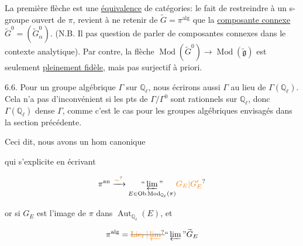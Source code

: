 La première flèche est une \uline{équivalence}  de catégories: le fait de restreindre   à un s-groupe ouvert de $\pi$, revient à  ne retenir de $\widetilde G=\pi^{\mathrm{alg}}$ que la \uline{composante connexe} $\widetilde G^0=(\widetilde G_\alpha^0)$. (N.B. Il  pas question de parler de composantes connexes dans le contexte analytique). Par contre, la flèche $\operatorname{Mod}(\widetilde G^0)\longrightarrow\operatorname{Mod}(\widetilde{\mathfrak g})$ est seulement \uline{pleinement fidèle}, mais pas    surjectif à priori.

6.6.  Pour un groupe algébrique  $\Gamma$ sur $\mathbb Q_\ell$, nous écrirons aussi $\Gamma$ au lieu de $\Gamma(\mathbb Q_\ell)$. Cela n'a pas d'inconvénient si les pts de $\Gamma/\Gamma^0$ sont rationnels sur $\mathbb Q_\ell$, donc $\Gamma(\mathbb Q_\ell)$ dense  $\Gamma$, comme c'est  le cas pour les groupes algébriques envisagés dans la section précédente.

Ceci dit, nous avons un hom canonique


qui s'explicite en écrivant

\[
\pi^{\mathrm{an}}\xrightarrow{\unsure{\sim}}\underset{E\in\operatorname{Ob}\operatorname{Mod}_{\mathbb Q_\ell}(\pi)}{\text{``}\varprojlim\text{''}}\unsure{G_E|G'_E}
\]

or si $G_E$ est l'image de $\pi$ dans $\operatorname{Aut}_{\mathbb Q_\ell}(E)$, et

\[
\pi^{\mathrm{alg}}=\deleted{\unsure{\operatorname{Lie}_\ell|\varprojlim}}\text{``}\varprojlim\text{''}\widetilde G_E
\]

